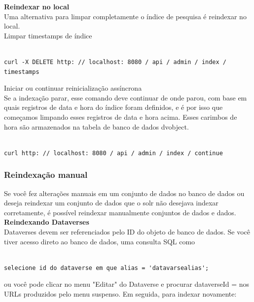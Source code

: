 \documentclass[12pt,hidelinks]{article}
\begin{document}
\textbf{Reindexar no local}\\

Uma alternativa para limpar completamente o índice de pesquisa é reindexar no local.\\

Limpar timestamps de índice

\begin{verbatim}

curl -X DELETE http: // localhost: 8080 / api / admin / index / 
timestamps

\end{verbatim}

Iniciar ou continuar reinicialização assíncrona\\

Se a indexação parar, esse comando deve continuar de onde parou, com base em quais registros de data e hora do índice foram definidos, e é por isso que começamos limpando esses registros de data e hora acima. Esses carimbos de hora são armazenados na tabela de banco de dados dvobject.

\begin{verbatim}

curl http: // localhost: 8080 / api / admin / index / continue

\end{verbatim}

\subsubsection{Reindexação manual}

\qquad Se você fez alterações manuais em um conjunto de dados no banco de dados ou deseja reindexar um conjunto de dados que o solr não desejava indexar corretamente, é possível reindexar manualmente conjuntos de dados e dados.\\

\textbf{Reindexando Dataverses}\\

Dataverses devem ser referenciados pelo ID do objeto de banco de dados. Se você tiver acesso direto ao banco de dados, uma consulta SQL como

\begin{verbatim}

selecione id do dataverse em que alias = 'datavarsealias';

\end{verbatim}

ou você pode clicar no menu "Editar" do Dataverse e procurar dataverseId = nos URLs produzidos pelo menu suspenso. Em seguida, para indexar novamente:
\end{document}
